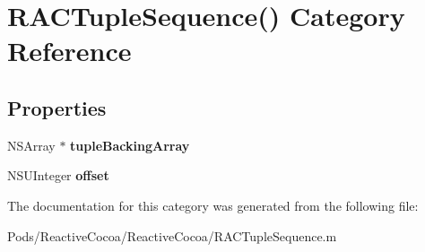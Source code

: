 \hypertarget{category_r_a_c_tuple_sequence_07_08}{}\section{R\+A\+C\+Tuple\+Sequence() Category Reference}
\label{category_r_a_c_tuple_sequence_07_08}
\subsection*{Properties}
\begin{DoxyCompactItemize}
\item 
\mbox{\label{category_r_a_c_tuple_sequence_07_08_aa2e288365b6f31ed4b275656bb99010c}} 
N\+S\+Array $\ast$ {\bfseries tuple\+Backing\+Array}
\item 
\mbox{\label{category_r_a_c_tuple_sequence_07_08_a53ff46d54284db2ca83fde7cf43c7979}} 
N\+S\+U\+Integer {\bfseries offset}
\end{DoxyCompactItemize}


The documentation for this category was generated from the following file\+:\begin{DoxyCompactItemize}
\item 
Pods/\+Reactive\+Cocoa/\+Reactive\+Cocoa/R\+A\+C\+Tuple\+Sequence.\+m\end{DoxyCompactItemize}
